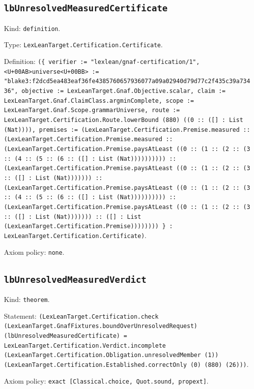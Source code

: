 \documentclass[11pt]{article}
\begin{document}
\subsection*{\texttt{lbUnresolvedMeasuredCertificate}}
\noindent Kind: \texttt{definition}.\par
\noindent Type: \texttt{LexLeanTarget.Certification.Certificate}.\par
\noindent Definition: \texttt{(\{ verifier := "lexlean/gnaf-certification/1", <U+00AB>universe<U+00BB> := "blake3:f2dcd5ea483eaf36fe4385760657936077a09a02940d79d77c2f435c39a73436", objective := LexLeanTarget.Gnaf.Objective.scalar, claim := LexLeanTarget.Gnaf.ClaimClass.argminComplete, scope := LexLeanTarget.Gnaf.Scope.grammarUniverse, route := LexLeanTarget.Certification.Route.lowerBound (880) ((0 :: ([] : List (Nat)))), premises := (LexLeanTarget.Certification.Premise.measured :: (LexLeanTarget.Certification.Premise.measured :: (LexLeanTarget.Certification.Premise.paysAtLeast ((0 :: (1 :: (2 :: (3 :: (4 :: (5 :: (6 :: ([] : List (Nat)))))))))) :: (LexLeanTarget.Certification.Premise.paysAtLeast ((0 :: (1 :: (2 :: (3 :: ([] : List (Nat))))))) :: (LexLeanTarget.Certification.Premise.paysAtLeast ((0 :: (1 :: (2 :: (3 :: (4 :: (5 :: (6 :: ([] : List (Nat)))))))))) :: (LexLeanTarget.Certification.Premise.paysAtLeast ((0 :: (1 :: (2 :: (3 :: ([] : List (Nat))))))) :: ([] : List (LexLeanTarget.Certification.Premise)))))))) \} : LexLeanTarget.Certification.Certificate)}.\par
\noindent Axiom policy: \texttt{none}.\par
\subsection*{\texttt{lbUnresolvedMeasuredVerdict}}
\noindent Kind: \texttt{theorem}.\par
\noindent Statement: \texttt{(LexLeanTarget.Certification.check (LexLeanTarget.GnafFixtures.boundOverUnresolvedRequest) (lbUnresolvedMeasuredCertificate) = LexLeanTarget.Certification.Verdict.incomplete (LexLeanTarget.Certification.Obligation.unresolvedMember (1)) (LexLeanTarget.Certification.Established.correctOnly (0) (880) (26)))}.\par
\noindent Axiom policy: \texttt{exact [Classical.choice, Quot.sound, propext]}.\par
\end{document}
